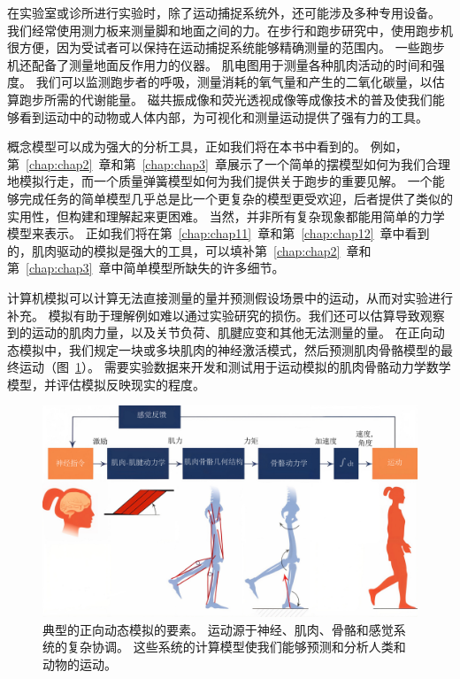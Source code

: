 在实验室或诊所进行实验时，除了运动捕捉系统外，还可能涉及多种专用设备。
我们经常使用测力板来测量脚和地面之间的力。在步行和跑步研究中，使用跑步机很方便，因为受试者可以保持在运动捕捉系统能够精确测量的范围内。
一些跑步机还配备了测量地面反作用力的仪器。
肌电图用于测量各种肌肉活动的时间和强度。
我们可以监测跑步者的呼吸，测量消耗的氧气量和产生的二氧化碳量，以估算跑步所需的代谢能量。
磁共振成像和荧光透视成像等成像技术的普及使我们能够看到运动中的动物或人体内部，为可视化和测量运动提供了强有力的工具。


概念模型可以成为强大的分析工具，正如我们将在本书中看到的。
例如，第~\ref{chap:chap2}~章和第~\ref{chap:chap3}~章展示了一个简单的摆模型如何为我们合理地模拟行走，而一个质量弹簧模型如何为我们提供关于跑步的重要见解。
一个能够完成任务的简单模型几乎总是比一个更复杂的模型更受欢迎，后者提供了类似的实用性，但构建和理解起来更困难。
当然，并非所有复杂现象都能用简单的力学模型来表示。
正如我们将在第~\ref{chap:chap11}~章和第~\ref{chap:chap12}~章中看到的，肌肉驱动的模拟是强大的工具，可以填补第~\ref{chap:chap2}~章和第~\ref{chap:chap3}~章中简单模型所缺失的许多细节。


计算机模拟可以计算无法直接测量的量并预测假设场景中的运动，从而对实验进行补充。
模拟有助于理解例如难以通过实验研究的损伤。我们还可以估算导致观察到的运动的肌肉力量，以及关节负荷、肌腱应变和其他无法测量的量。
在正向动态模拟中，我们规定一块或多块肌肉的神经激活模式，然后预测肌肉骨骼模型的最终运动（图~\ref{fig:1_12}）。
需要实验数据来开发和测试用于运动模拟的肌肉骨骼动力学数学模型，并评估模拟反映现实的程度。


\begin{figure}[!htb]
	\centering
	\includegraphics[width=1.0\linewidth]{chap1/1_12}
	\caption{典型的正向动态模拟的要素。
		运动源于神经、肌肉、骨骼和感觉系统的复杂协调。
		这些系统的计算模型使我们能够预测和分析人类和动物的运动。 \label{fig:1_12}}
\end{figure}


